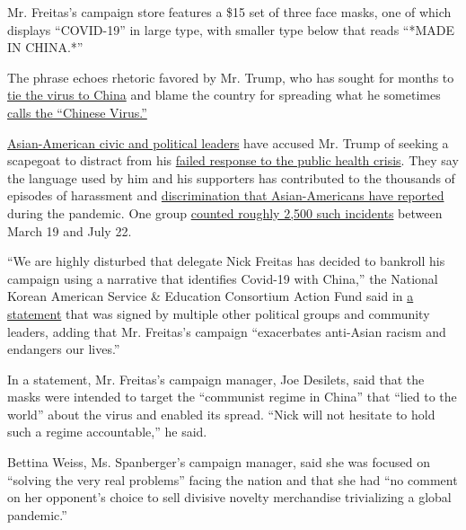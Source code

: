 Mr. Freitas's campaign store features a \$15 set of three face masks,
one of which displays ``COVID-19'' in large type, with smaller type
below that reads ``*MADE IN CHINA.*''

The phrase echoes rhetoric favored by Mr. Trump, who has sought for
months to
\href{https://www.nytimes3xbfgragh.onion/2020/05/29/health/virus-who.html}{tie
the virus to China} and blame the country for spreading what he
sometimes
\href{https://www.nytimes3xbfgragh.onion/2020/03/18/us/politics/china-virus.html}{calls
the ``Chinese Virus.''}

\href{https://www.nytimes3xbfgragh.onion/2020/03/29/us/politics/coronavirus-asian-americans.html}{Asian-American
civic and political leaders} have accused Mr. Trump of seeking a
scapegoat to distract from his
\href{https://www.nytimes3xbfgragh.onion/2020/07/18/us/politics/trump-coronavirus-response-failure-leadership.html}{failed
response to the public health crisis}. They say the language used by him
and his supporters has contributed to the thousands of episodes of
harassment and
\href{https://www.nytimes3xbfgragh.onion/2020/03/23/us/chinese-coronavirus-racist-attacks.html}{discrimination
that Asian-Americans have reported} during the pandemic. One group
\href{https://stopaapihate.org/}{counted roughly 2,500 such incidents}
between March 19 and July 22.

``We are highly disturbed that delegate Nick Freitas has decided to
bankroll his campaign using a narrative that identifies Covid-19 with
China,'' the National Korean American Service \& Education Consortium
Action Fund said in \href{https://nakasecactionfund.org/11546}{a
statement} that was signed by multiple other political groups and
community leaders, adding that Mr. Freitas's campaign ``exacerbates
anti-Asian racism and endangers our lives.''

In a statement, Mr. Freitas's campaign manager, Joe Desilets, said that
the masks were intended to target the ``communist regime in China'' that
``lied to the world'' about the virus and enabled its spread. ``Nick
will not hesitate to hold such a regime accountable,'' he said.

Bettina Weiss, Ms. Spanberger's campaign manager, said she was focused
on ``solving the very real problems'' facing the nation and that she had
``no comment on her opponent's choice to sell divisive novelty
merchandise trivializing a global pandemic.''

\hypertarget{-12}{%
\subsection{}\label{-12}}

